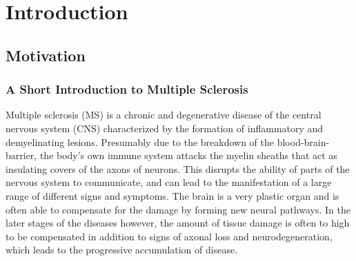 \chapter{Introduction}


\section{Motivation}

\subsection{A Short Introduction to Multiple Sclerosis}

Multiple sclerosis (MS) is a chronic and degenerative disease of the central
nervous system (CNS) characterized by the formation of inflammatory
and demyelinating lesions. Presumably due to the breakdown of the
blood-brain-barrier, the body's own immune system attacks the myelin sheaths
that act as insulating covers of the axons of neurons. This disrupts the ability
of parts of the nervous system to communicate, and can lead to the manifestation
of a large range of different signs and symptoms. The brain is a very plastic
organ and is often able to compensate for the damage by forming new neural
pathways. In the later stages of the diseases however, the amount of tissue
damage is often to high to be compensated in addition to signs of axonal loss
and neurodegeneration, which leads to the progressive accumulation of disease.

